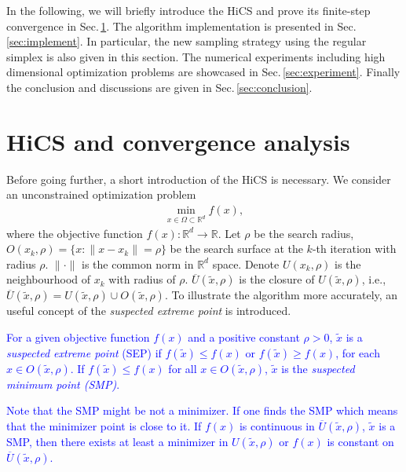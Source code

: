 \documentclass[mathpazo]{csam}
\newcommand{\bbR}{\mathbb{R}}
\theoremstyle{remark}
\begin{document}
In the following, we will briefly introduce the HiCS and
prove its finite-step convergence in Sec.\,\ref{sec:algorithm}. 
The algorithm implementation is presented in Sec.\,\ref{sec:implement}.
In particular, the new sampling strategy using the regular simplex is
also given in this section.
The numerical experiments including high dimensional optimization
problems are showcased in Sec.\,\ref{sec:experiment}. 
Finally the conclusion and discussions are given in Sec.\,\ref{sec:conclusion}.

\section{HiCS and convergence analysis}
\label{sec:algorithm}

Before going further, a short introduction of the HiCS is necessary.
We consider an unconstrained optimization problem 
\begin{align}
	\min_{x\in\Omega\subset\mathbb{R}^d} f(x),
	\label{}
\end{align}
where the objective function $f(x):\bbR^d\rightarrow \bbR$.
Let $\rho$ be the search radius, $O(x_k, \rho)=\{x:
\|x-x_k \|=\rho\}$ be the search surface at the
$k$-th iteration with radius $\rho$. $\|\cdot \|$ is the common
norm in $\bbR^d$ space. Denote $U(x_k, \rho)$ is the neighbourhood of
$x_k$ with radius of $\rho$.  
$\overline{U}(\tilde{x}, \rho)$ is the closure of $U(\tilde{x}, \rho)$, i.e., 
$\overline{U}(\tilde{x}, \rho) = U(\tilde{x}, \rho)\cup O(\tilde{x}, \rho) $.
To illustrate the algorithm
more accurately, an useful concept of the \textit{suspected extreme point}
is introduced.

\textcolor{blue}{
\begin{definition}	
	For a given objective function $f(x)$ and a positive constant 
	$\rho>0$, $\tilde{x}$ is a \textit{suspected extreme point} (SEP) if
	$f(\tilde x)\leq f(x)$ or $f(\tilde x)\geq f(x)$, for each $x \in O(\tilde{x},\rho)$.
	If $f(\tilde x) \leq f(x)$ for all $x\in O(\tilde{x},\rho)$,
	$\tilde{x}$ is the \textit{suspected minimum point (SMP)}.
\end{definition}
\begin{remark}
	Note that the SMP might be not a minimizer. If one finds the SMP which means
	that the minimizer point is close to it.
	If $f(x)$ is continuous in $\overline{U}(\tilde{x}, \rho)$,
	$\tilde x$ is a SMP, then there exists at least a minimizer in $U(\tilde x,
	\rho)$ or $f(x)$ is constant on $\overline{U}(\tilde x, \rho)$.
\end{remark}
}
\end{document}
